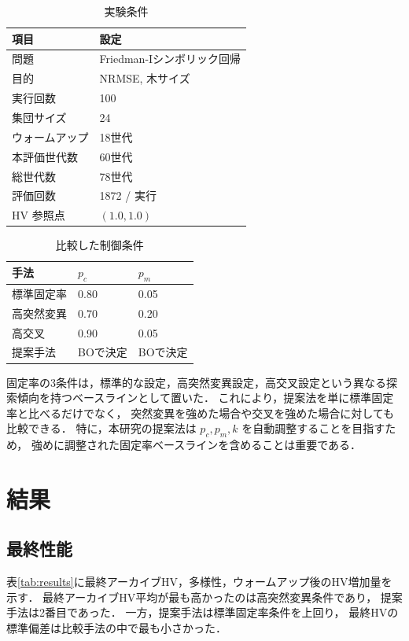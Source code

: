 \documentclass[a4paper,10pt,twocolumn]{ltjsarticle}
\begin{document}
\begin{table}[tb]
\centering
\caption{実験条件}
\label{tab:setting}
\small
\begin{tabular}{@{}ll@{}}
\toprule
項目 & 設定 \\
\midrule
問題 & Friedman-Iシンボリック回帰 \\
目的 & NRMSE, 木サイズ \\
実行回数 & 100 \\
集団サイズ & 24 \\
ウォームアップ & 18世代 \\
本評価世代数 & 60世代 \\
総世代数 & 78世代 \\
評価回数 & 1872 / 実行 \\
HV 参照点 & \((1.0,1.0)\) \\
\bottomrule
\end{tabular}
\end{table}

\begin{table}[tb]
\centering
\caption{比較した制御条件}
\label{tab:methods}
\small
\begin{tabular}{@{}lll@{}}
\toprule
手法 & \(p_c\) & \(p_m\) \\
\midrule
標準固定率 & 0.80 & 0.05 \\
高突然変異 & 0.70 & 0.20 \\
高交叉 & 0.90 & 0.05 \\
提案手法 & BOで決定 & BOで決定 \\
\bottomrule
\end{tabular}
\end{table}

固定率の3条件は，標準的な設定，高突然変異設定，高交叉設定という異なる探索傾向を持つベースラインとして置いた．
これにより，提案法を単に標準固定率と比べるだけでなく，
突然変異を強めた場合や交叉を強めた場合に対しても比較できる．
特に，本研究の提案法は \(p_c,p_m,k\) を自動調整することを目指すため，
強めに調整された固定率ベースラインを含めることは重要である．

\section{結果}

\subsection{最終性能}

表\ref{tab:results}に最終アーカイブHV，多様性，ウォームアップ後のHV増加量を示す．
最終アーカイブHV平均が最も高かったのは高突然変異条件であり，
提案手法は2番目であった．
一方，提案手法は標準固定率条件を上回り，
最終HVの標準偏差は比較手法の中で最も小さかった．
\end{document}
